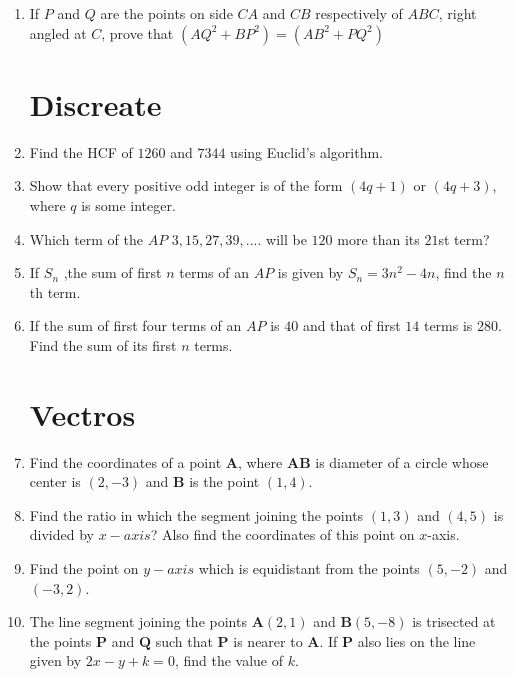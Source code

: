 \documentclass[12pt,-letter paper]{article}
\let\vec\mathbf{}
\let\vec\mathbf{}
\let\vec\mathbf{}
\providecommand{\brak}[1]{\ensuremath{\left(#1\right)}}\graphicspath{{/storage/self/primary/Download/latexnew/fig}}
\begin{document}
\begin{enumerate}
\begin{figure}[H]
                \end{figure}
\item If $P$ and $Q$ are the points on side $CA$ and $CB$ respectively of  $ABC$, right angled at $C$, prove that $\brak{AQ^2 + BP^2} = \brak{AB^2 +PQ^2}$

\section{Discreate}
\item Find the HCF of $1260$ and $7344$ using Euclid's algorithm.
\item Show that every positive odd integer is of the form $\brak{4q+1}$ or $\brak{4q+3}$, where $q$ is some integer.
\item Which term of the $AP$ $3, 15, 27, 39, ....$ will be $120$ more than its $21$st term?
\item If $S_n$ ,the sum of first $n$ terms of an $AP$ is given by $S_n=3n^2-4n$, find the $n$th term.
\item If the sum of first four terms of an $AP$ is $40$ and that of first $14$ terms is $280$. Find the sum of its first $n$ terms.








\section{Vectros}
\item Find the coordinates of a point $\vec{A}$, where $\vec{AB}$ is diameter of a circle whose center is $\brak{2,-3}$ and $\vec{B}$ is the point $\brak{1,4}$.
\item Find the ratio in which the segment joining the points $\brak{1, 3}$ and $\brak{4, 5}$ is divided by $x-axis$? Also find the coordinates of this point on  $x$-axis.
\item Find the point on $y-axis$ which is equidistant from the points $\brak{5, -2}$ and $\brak{-3, 2}$.    
\item The line segment joining the points $\vec{A}\brak{2, 1}$ and $\vec{B}\brak{5, -8}$ is trisected at the points $\vec{P}$ and $\vec{Q}$ such that $\vec{P}$ is nearer to $\vec{A}$. If $\vec{P}$ also lies on the line given by $2x-y+k=0$, find the value of $k$.


\end{enumerate}
\end{document}
